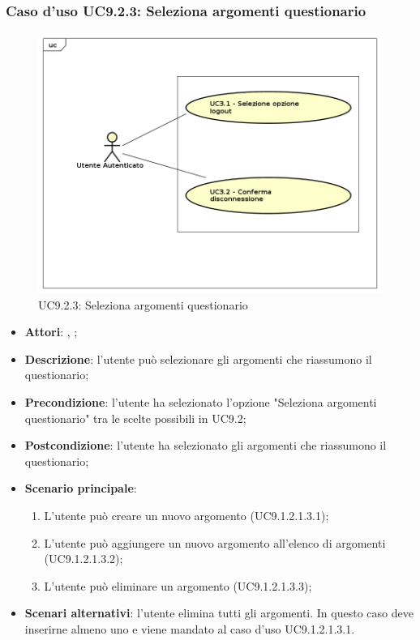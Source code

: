 		\subsubsection{Caso d'uso UC9.2.3: Seleziona argomenti questionario}
		\label{UC9.2.3}
		\begin{figure}[h]
			\centering
		\includegraphics[scale=0.5,keepaspectratio]{UML/UC9.png}
			\caption{UC9.2.3: Seleziona argomenti questionario}
		\end{figure}
		\FloatBarrier
		\begin{itemize}
			\item \textbf{Attori}: \uau, \uaupro;
			\item \textbf{Descrizione}: l'utente può selezionare gli argomenti che riassumono il questionario;
			\item \textbf{Precondizione}: l'utente ha selezionato l'opzione "Seleziona argomenti questionario" tra le scelte possibili in UC9.2; 
			\item \textbf{Postcondizione}: l'utente ha selezionato gli argomenti che riassumono il questionario; 
			\item \textbf{Scenario principale}:
			\begin{enumerate}
				\item L'utente può creare un nuovo argomento (UC9.1.2.1.3.1);
				\item L'utente può aggiungere un nuovo argomento all'elenco di argomenti (UC9.1.2.1.3.2);
				\item L'utente può eliminare un argomento (UC9.1.2.1.3.3);
			\end{enumerate}
			\item \textbf{Scenari alternativi}: l'utente elimina tutti gli argomenti. In questo caso deve inserirne almeno uno e viene mandato al caso d'uso UC9.1.2.1.3.1.
		\end{itemize}
							
